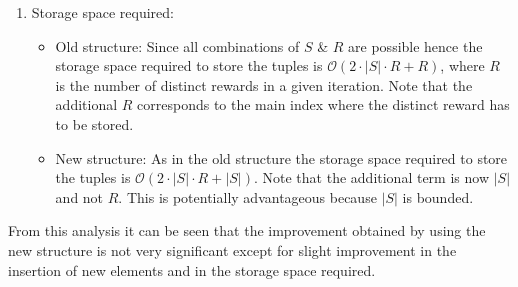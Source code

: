 \documentclass[a4paper,12pt]{article}
\begin{document}
\begin{enumerate}
	\item Storage space required:
	\begin{itemize}
	\item Old structure: Since all combinations of $S$ \& $R$ are possible hence the storage space required to store the tuples is $\mathcal{O}(2 \cdot |S|\cdot R + R)$, where $R$ is the number of distinct rewards in a given iteration. Note that the additional $R$ corresponds to the main index where the distinct reward has to be stored.
	\item New structure: As in the old structure the storage space required to store the tuples is $\mathcal{O}(2\cdot |S|\cdot R + |S|)$. Note that the additional term is now $|S|$ and not $R$. This is potentially advantageous because $|S|$ is bounded.
	\end{itemize} 
\end{enumerate}
From this analysis it can be seen that the improvement obtained by using the new structure is not very significant except for slight improvement in the insertion of new elements and in the storage space required.
\end{document}
